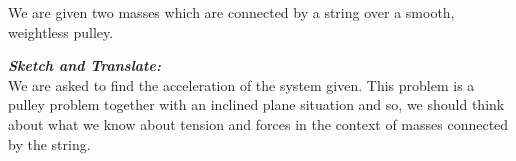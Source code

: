 %
%
%


\begin{subquestions}
	
\subquestion

We are given two masses which are connected by a string over a smooth, weightless pulley.

\begin{subsubquestions}
	
	\subsubquestion
	
	\textbf{\textit{Sketch and Translate:}} \\
	We are asked to find the acceleration of the system given. This problem is a pulley problem together with an inclined plane situation and so, we should think about what we know about tension and forces in the context of masses connected by the string. \\
	
	
	

\end{subsubquestions}
\end{subquestions}
